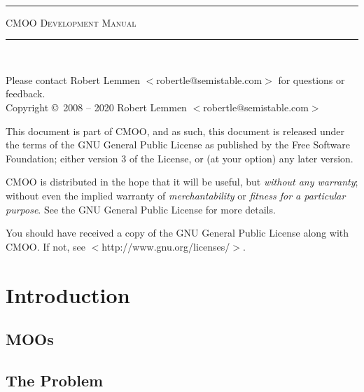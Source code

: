 \documentclass[12pt,a4paper]{article}
\let\oldsection\section
\renewcommand\section{\clearpage\oldsection}
\begin{document}
\thispagestyle{empty}
~\vspace{141pt}
\begin{center}
\rule{\textwidth}{1pt}\vspace{20pt}
{\Huge\scshape CMOO Development Manual}\vspace{8pt}
\rule{\textwidth}{1pt}
\end{center}
\clearpage

\thispagestyle{empty}
\ifdefined\gitversion\gitversion\fi~

Please contact Robert Lemmen $<$robertle@semistable.com$>$ for questions or
feedback.
\\
Copyright \copyright~2008 -- 2020 Robert Lemmen $<$robertle@semistable.com$>$

This document is part of CMOO, and as such, this document is released under the terms of the GNU General Public License as published by the Free Software Foundation; either version 3 of the License, or (at your option) any later version.

CMOO is distributed in the hope that it will be useful, but {\em without any
warranty}; without even the implied warranty of {\em merchantability} or {\em
fitness for a particular purpose}.  See the GNU General Public License for more details.

You should have received a copy of the GNU General Public License along with CMOO. If not, see $<$http://www.gnu.org/licenses/$>$.
\cleardoublepage

\tableofcontents
\cleardoublepage

\section{Introduction}\label{sec:introduction}


\subsection{MOOs}


\subsection{The Problem}

\end{document}
